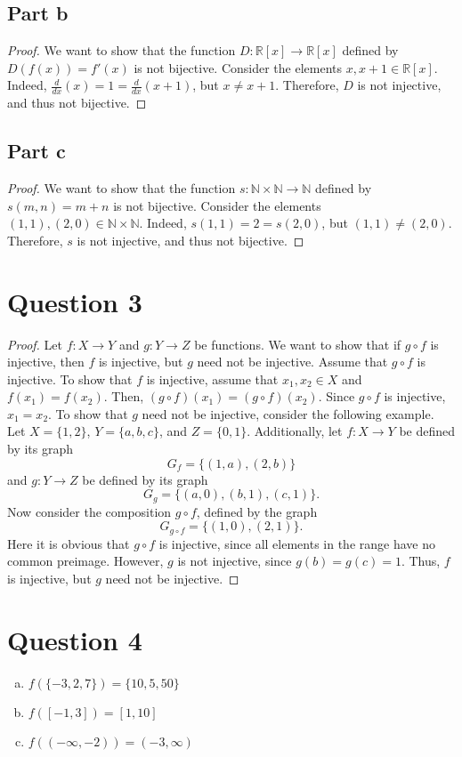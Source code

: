 \documentclass{article}
\begin{document}
\subsection*{Part b}
\begin{proof}
We want to show that the function $D: \mathbb{R}[x] \to \mathbb{R}[x]$ defined by $D(f(x)) = f'(x)$ is not bijective.
Consider the elements $x, x + 1 \in \mathbb{R}[x]$.
Indeed, $\frac{d}{dx}(x) = 1 = \frac{d}{dx}(x + 1)$, but $x \neq x + 1$.
Therefore, $D$ is not injective, and thus not bijective.
\end{proof}

\subsection*{Part c}
\begin{proof}
We want to show that the function $s: \mathbb{N} \times \mathbb{N} \to \mathbb{N}$ defined by $s(m, n) = m + n$ is not bijective.
Consider the elements $(1, 1), (2, 0) \in \mathbb{N} \times \mathbb{N}$.
Indeed, $s(1, 1) = 2 = s(2, 0)$, but $(1, 1) \neq (2, 0)$.
Therefore, $s$ is not injective, and thus not bijective.
\end{proof}

\section*{Question 3}
\begin{proof}
Let $f: X \to Y$ and $g: Y \to Z$ be functions.
We want to show that if $g \circ f$ is injective, then $f$ is injective, but $g$ need not be injective.
Assume that $g \circ f$ is injective.
To show that $f$ is injective, assume that $x_1, x_2 \in X$ and $f(x_1) = f(x_2)$.
Then, $(g \circ f)(x_1) = (g \circ f)(x_2)$.
Since $g \circ f$ is injective, $x_1 = x_2$.
To show that $g$ need not be injective, consider the following example.
Let $X = \{1, 2\}$, $Y = \{a, b, c\}$, and $Z = \{0, 1\}$.
Additionally, let $f: X \to Y$ be defined by its graph 
$$G_f = \{(1, a), (2, b)\}$$ and $g: Y \to Z$ be defined by its graph $$G_g = \{(a, 0), (b, 1), (c, 1)\}.$$
Now consider the composition $g \circ f$, defined by the graph $$G_{g \circ f} = \{(1, 0), (2, 1)\}.$$
Here it is obvious that $g \circ f$ is injective, since all elements in the range have no common preimage.
However, $g$ is not injective, since $g(b) = g(c) = 1$.
Thus, $f$ is injective, but $g$ need not be injective.
\end{proof}

\section*{Question 4}
\begin{enumerate}[(a)]
    \item $f(\{-3, 2, 7\}) = \{10, 5, 50\}$
    \item $f([-1, 3]) = [1, 10]$
    \item $f((-\infty, -2)) = (-3, \infty)$
\end{enumerate}
\end{document}

